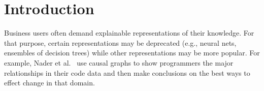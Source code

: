 \documentclass[]{svjour3}
\begin{document}





 



\section{Introduction}

Business users often demand explainable representations of their knowledge. For that purpose, certain representations may be deprecated  (e.g., neural nets, ensembles of decision trees) while other representations may be more popular. For example, Nader et al.~\cite{Poshyvanyk24} use causal graphs to show programmers the major relationships in their code data and then make conclusions on the best ways to effect change in that domain.  
\end{document}
